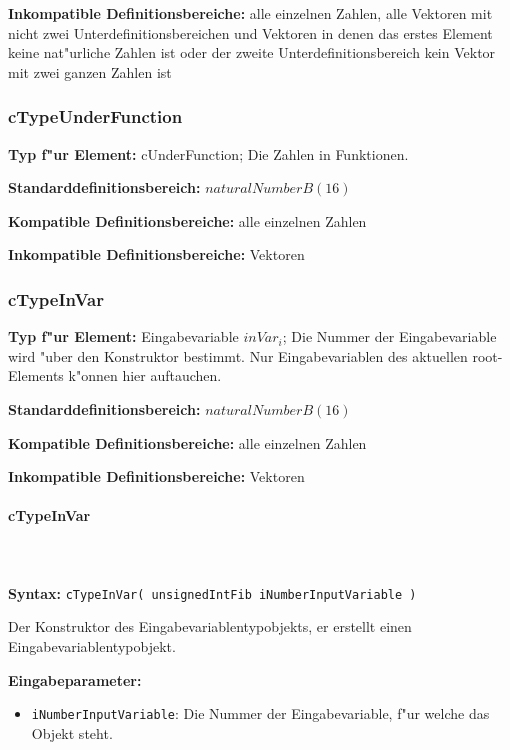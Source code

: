 \bigskip\noindent
\textbf{Inkompatible Definitionsbereiche:} alle einzelnen Zahlen, alle Vektoren mit nicht zwei Unterdefinitionsbereichen und Vektoren in denen das erstes Element keine nat"urliche Zahlen ist oder der zweite Unterdefinitionsbereich kein Vektor mit zwei ganzen Zahlen ist


\subsubsection{cTypeUnderFunction}

\textbf{Typ f"ur Element:} cUnderFunction; Die Zahlen in Funktionen.

\bigskip\noindent
\textbf{Standarddefinitionsbereich:} $naturalNumberB(16)$

\bigskip\noindent
\textbf{Kompatible Definitionsbereiche:} alle einzelnen Zahlen

\bigskip\noindent
\textbf{Inkompatible Definitionsbereiche:} Vektoren


\subsubsection{cTypeInVar}

\textbf{Typ f"ur Element:} Eingabevariable $inVar_i$; Die Nummer der Eingabevariable wird "uber den Konstruktor bestimmt. Nur Eingabevariablen des aktuellen root-Elements k"onnen hier auftauchen.

\bigskip\noindent
\textbf{Standarddefinitionsbereich:} $naturalNumberB(16)$

\bigskip\noindent
\textbf{Kompatible Definitionsbereiche:} alle einzelnen Zahlen

\bigskip\noindent
\textbf{Inkompatible Definitionsbereiche:} Vektoren


\paragraph{cTypeInVar}

\ \\\\\noindent
\textbf{Syntax:} \verb|cTypeInVar( unsignedIntFib iNumberInputVariable )|

\bigskip\noindent
Der Konstruktor des Eingabevariablentypobjekts, er erstellt einen Eingabevariablentypobjekt.

\bigskip\noindent
\textbf{Eingabeparameter:}
\begin{itemize}
 \item \verb|iNumberInputVariable|: Die Nummer der Eingabevariable, f"ur welche das Objekt steht.
\end{itemize}

